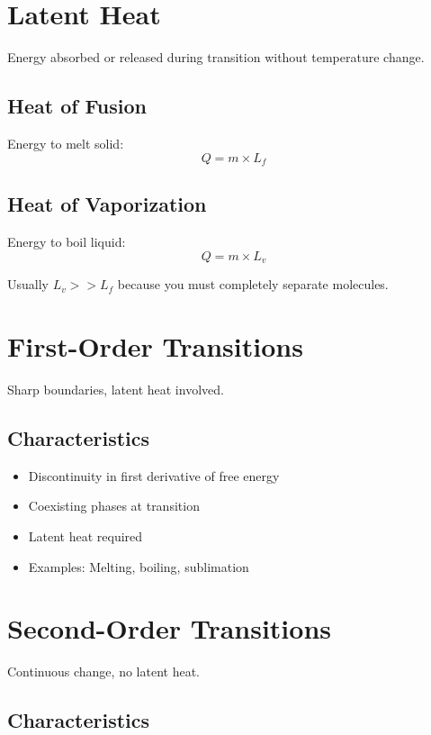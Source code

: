 \documentclass[
  11pt,
  letterpaper,
  twoside,
  openright]{book}
\providecommand{\tightlist}{%
  \setlength{\itemsep}{0pt}\setlength{\parskip}{0pt}}
\begin{document}
\section{Latent Heat}\label{latent-heat}

Energy absorbed or released during transition without temperature
change.

\subsection{Heat of Fusion}\label{heat-of-fusion}

Energy to melt solid: \[
Q = m \times L_f
\]

\subsection{Heat of Vaporization}\label{heat-of-vaporization}

Energy to boil liquid: \[
Q = m \times L_v
\]

Usually \(L_v >> L_f\) because you must completely separate molecules.

\section{First-Order Transitions}\label{first-order-transitions}

Sharp boundaries, latent heat involved.

\subsection{Characteristics}\label{characteristics}

\begin{itemize}
\tightlist
\item
  Discontinuity in first derivative of free energy
\item
  Coexisting phases at transition
\item
  Latent heat required
\item
  Examples: Melting, boiling, sublimation
\end{itemize}

\section{Second-Order Transitions}\label{second-order-transitions}

Continuous change, no latent heat.

\subsection{Characteristics}\label{characteristics-1}
\end{document}
